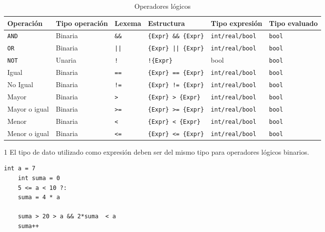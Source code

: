 \documentclass[11pt, english]{article}
\begin{document}
	\begin{table}[H]
		\begin{center}
			\caption{Operadores lógicos}\label{tab:logic-operators}
			\begin{threeparttable}
				\begin{tabular}{l|lllll}
					\toprule
					\textbf{Operación} & \textbf{Tipo operación} & \textbf{Lexema} & \textbf{Estructura} & \textbf{Tipo expresión}\tnote{1} & \textbf{Tipo evaluado}\\
					\midrule
					\texttt{AND} & Binaria & \texttt{\&\&} & \texttt{\{Expr\} \&\& \{Expr\}} & \texttt{int/real/bool} & \texttt{bool}\\
					\texttt{OR} & Binaria & \texttt{||} & \texttt{\{Expr\} || \{Expr\}} & \texttt{int/real/bool} & \texttt{bool}\\
					\texttt{NOT} & Unaria & \texttt{!} & \texttt{!\{Expr\}} & bool & \texttt{bool}\\
					Igual & Binaria & \texttt{==} & \texttt{\{Expr\} == \{Expr\}} & \texttt{int/real/bool} & \texttt{bool}\\
					No Igual & Binaria & \texttt{!=} & \texttt{\{Expr\} != \{Expr\}} & \texttt{int/real/bool} & \texttt{bool}\\
					Mayor & Binaria & \texttt{>} & \texttt{\{Expr\} > \{Expr\}} & \texttt{int/real/bool} & \texttt{bool}\\
					Mayor o igual & Binaria & \texttt{>=} & \texttt{\{Expr\} >= \{Expr\}} & \texttt{int/real/bool} & \texttt{bool}\\
					Menor & Binaria & \texttt{<} & \texttt{\{Expr\} < \{Expr\}} & \texttt{int/real/bool} & \texttt{bool}\\
					Menor o igual & Binaria & \texttt{<=} & \texttt{\{Expr\} <= \{Expr\}} & \texttt{int/real/bool} & \texttt{bool}\\
					\bottomrule
				\end{tabular}
				\begin{tablenotes}
					\small
					\item[1] El tipo de dato utilizado como expresión deben ser del mismo tipo para operadores lógicos binarios.
				\end{tablenotes}
			\end{threeparttable}
		\end{center}
	\end{table}
	
	\begin{lstlisting}[caption=Ejemplo de uso los operadores lógicos]
	int a = 7
	int suma = 0
	5 <= a < 10 ?:
	suma = 4 * a
	
	suma > 20 > a && 2*suma  < a
	suma++
	\end{lstlisting}
	
\end{document}
